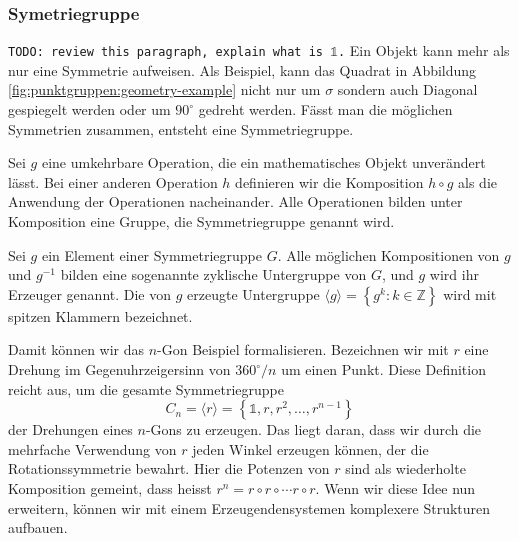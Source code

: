 \subsubsection{Symetriegruppe}
\texttt{TODO: review this paragraph, explain what is \(\mathds{1}\).}
Ein Objekt kann mehr als nur eine Symmetrie aufweisen.
Als Beispiel, kann das Quadrat in Abbildung \ref{fig:punktgruppen:geometry-example}
nicht nur um $\sigma$ sondern auch Diagonal gespiegelt werden oder um $90^\circ$ gedreht werden.
Fässt man die möglichen Symmetrien zusammen, entsteht eine Symmetriegruppe.

\begin{definition}[Symmetriegruppe]
	Sei \(g\) eine umkehrbare Operation, die ein mathematisches Objekt
	unverändert lässt.  Bei einer anderen Operation \(h\) definieren wir die
	Komposition \(h\circ g\) als die Anwendung der Operationen nacheinander. Alle
	Operationen bilden unter Komposition eine Gruppe, die Symmetriegruppe genannt
	wird.
\end{definition} %

\begin{definition}
	Sei \(g\) ein Element einer Symmetriegruppe \(G\). Alle möglichen
	Kompositionen von \(g\) und \(g^{-1}\) bilden eine sogenannte zyklische
	Untergruppe von \(G\), und \(g\) wird ihr Erzeuger genannt. Die von \(g\)
	erzeugte Untergruppe \(\langle g \rangle = \left\{ g^k : k \in \mathbb{Z}
	\right\}\) wird mit spitzen Klammern bezeichnet.
\end{definition}

Damit können wir das \(n\)-Gon Beispiel formalisieren.
Bezeichnen wir mit \(r\) eine Drehung im Gegenuhrzeigersinn von \(360^\circ/n\)
um einen Punkt.  Diese Definition reicht aus, um die gesamte Symmetriegruppe
\[
	C_n = \langle r \rangle
		= \left\{\mathds{1}, r, r^2, \ldots, r^{n-1}\right\}
\]
der Drehungen eines \(n\)-Gons zu erzeugen. Das liegt daran, dass wir durch die
mehrfache Verwendung von \(r\) jeden Winkel erzeugen k\"onnen, der die
Rotationssymmetrie bewahrt. Hier die Potenzen von \(r\) sind als wiederholte
Komposition gemeint, dass heisst \(r^n = r\circ r \circ \cdots r\circ r\).
Wenn wir diese Idee nun erweitern, können wir mit einem Erzeugendensystemen
komplexere Strukturen aufbauen.


